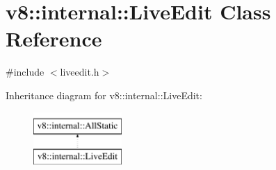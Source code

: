 \hypertarget{classv8_1_1internal_1_1LiveEdit}{}\section{v8\+:\+:internal\+:\+:Live\+Edit Class Reference}
\label{classv8_1_1internal_1_1LiveEdit}


{\ttfamily \#include $<$liveedit.\+h$>$}

Inheritance diagram for v8\+:\+:internal\+:\+:Live\+Edit\+:\begin{figure}[H]
\begin{center}
\leavevmode
\includegraphics[height=2.000000cm]{classv8_1_1internal_1_1LiveEdit}
\end{center}
\end{figure}
